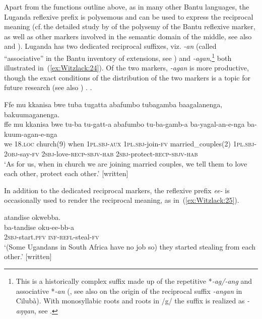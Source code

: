 \documentclass[output=paper,colorlinks,citecolor=brown,
]{langscibook}
\begin{document}
Apart from the functions outline above, as in many other Bantu languages, the Luganda reflexive prefix is polysemous and can be used to express the reciprocal meaning (cf.\,the detailed study by \citealt{DomEtAl2016} of the polysemy of the Bantu reflexive marker, as well as other markers involved in the semantic domain of the middle, see also \citealt{Polak1983} and \citealt{Marlo2015-1}). %
Luganda has two dedicated reciprocal suffixes, 
viz. \emph{-an} (called “associative” in the Bantu inventory of extensions, 
see \citealt[173]{SchadebergBostoen2019}) and \emph{-agan},\footnote{This is a historically complex suffix made up of the repetitive *\textit{-ag/-ang} and associative *\textit{-an} (\citealt[173]{SchadebergBostoen2019}, see also \citealt{DomEtAl2016} on the origin of the reciprocal suffix \emph{-angan} in Cilubà). With monosyllabic roots and roots in /g/ the suffix is realized as \emph{-aŋŋan}, see \citet[356]{AshtonEtAl1954}.} both illustrated in~(\ref{ex:Witzlack:24}). Of the two markers, \emph{-agan} is more productive, though the exact conditions of the distribution of the two markers is a topic for future research (see also \citealt[ 44–45]{McPherson2008Descriptive}) . 
.


\ea
\label{ex:Witzlack:24}
 
    \glll Ffe mu kkanisa bwe tuba tugatta abafumbo tubagamba baagalanenga, bakuumaganenga.\\
    ffe	mu	kkanisa	bwe	tu-ba tu-gatt-a	abafumbo tu-ba-gamb-a		ba-yagal-an-e-nga	ba-kuum-agan-e-nga\\
    we	\textsc{18.loc}	church(9)	when \textsc{1pl.sbj-aux}	\textsc{1pl.sbj}-join-\textsc{fv}	married\_couples(2) \textsc{1pl.sbj-2obj}-say-\textsc{fv} \textsc{2sbj}-love-\textsc{recp-sbjv-hab}	\textsc{2sbj}-protect-\textsc{recp-sbjv-hab} \\
    \glt ‘As for us, when in church we are joining married couples, we tell them to love each other, protect each other.’ [written]%

\z


In addition to the dedicated reciprocal markers, the reflexive prefix \emph{ee-} is occasionally used to render the reciprocal meaning, as in~(\ref{ex:Witzlack:25}). 

\ea\label{ex:Witzlack:25}

\ea \label{ex:Witzlack:25a}
    \glll [B]atandise okwebba.\\
    ba-tandise	oku-ee-bb-a\\
    \textsc{2sbj}-start.\textsc{pfv}	\textsc{inf}-\textsc{refl}-steal-\textsc{fv}\\
    \glt ‘(Some Ugandans in South Africa have no job so) they started stealing from each other.’ [written]%
\end{document}
